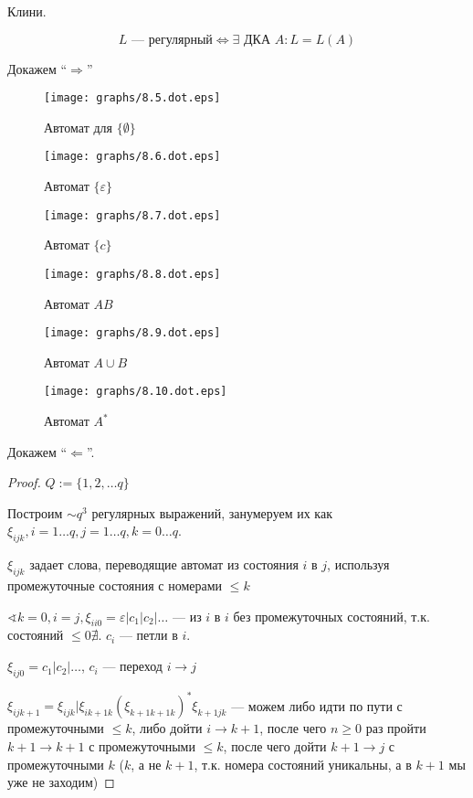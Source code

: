 \begin{theorem}
    Клини.

    $$L \text{ --- регулярный} \Leftrightarrow \exists \text{ ДКА } A : L = L(A)$$
\end{theorem}
Докажем ``$\Rightarrow$''
\begin{figure}[h]
    \centering
    \begin{minipage}{.3\textwidth}
        \centering
        \texttt{[image: graphs/8.5.dot.eps]}
        \caption{Автомат для $\{\emptyset\}$}
    \end{minipage}%
    \begin{minipage}{.3\textwidth}
        \centering
        \texttt{[image: graphs/8.6.dot.eps]}
        \caption{Автомат $\{\varepsilon\}$}
    \end{minipage}
    \begin{minipage}{.3\textwidth}
        \centering
        \texttt{[image: graphs/8.7.dot.eps]}
        \caption{Автомат $\{c\}$}
    \end{minipage}
    \begin{minipage}{.5\textwidth}
        \centering
        \texttt{[image: graphs/8.8.dot.eps]}
        \caption{Автомат $AB$}
    \end{minipage}%
    \begin{minipage}{.5\textwidth}
        \centering
        \texttt{[image: graphs/8.9.dot.eps]}
        \caption{Автомат $A\cup B$}
    \end{minipage}
    \begin{minipage}{.5\textwidth}
        \centering
        \texttt{[image: graphs/8.10.dot.eps]}
        \caption{Автомат $A^*$}
    \end{minipage}
\end{figure}

Докажем ``$\Leftarrow$''.
\begin{proof}
    $Q:=\{1,2,\ldots q\}$

    Построим $\sim q^3$ регулярных выражений, занумеруем их как $\xi_{ijk}, i=1\ldots q, j=1\ldots q, k = 0\ldots q$.

    $\xi_{ijk}$ задает слова, переводящие автомат из состояния $i$ в $j$, используя промежуточные состояния с номерами $\leq k$

    $\sphericalangle k=0, i=j, \xi_{ii0}=\varepsilon|c_1|c_2|\ldots$ --- из $i$ в $i$ без промежуточных состояний, т.к. состояний $\leq 0 \nexists$. $c_i$ --- петли в $i$.

    $\xi_{ij0}=c_1|c_2|\ldots$, $c_i$ --- переход $i\to j$

    $\xi_{ijk+1}=\xi_{ijk}|\xi_{ik+1k}(\xi_{k+1k+1k})^*\xi_{k+1jk}$ --- можем либо идти по пути с промежуточными $\leq k$, либо дойти $i\to k+1$, после чего $n\geq 0$ раз пройти $k+1\to k+1$ с промежуточными $\leq k$, после чего дойти $k+1\to j$  с промежуточными $k$ ($k$, а не $k+1$, т.к. номера состояний уникальны, а в $k+1$ мы уже не заходим)
\end{proof}


